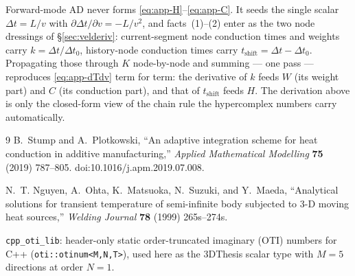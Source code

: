 \documentclass[11pt]{article}
\begin{document}
Forward-mode AD never forms \eqref{eq:app-H}--\eqref{eq:app-C}. It seeds the
single scalar $\Delta t = L/v$ with $\partial\Delta t/\partial v = -L/v^2$, and
facts~(1)--(2) enter as the two node dressings of \S\ref{sec:velderiv}:
current-segment node conduction times and weights carry $k = \Delta t/\Delta t_0$,
history-node conduction times carry $t_{\mathrm{shift}} = \Delta t - \Delta
t_0$. Propagating those through $K$ node-by-node and summing --- one pass ---
reproduces \eqref{eq:app-dTdv} term for term: the derivative of $k$ feeds $W$
(its weight part) and $C$ (its conduction part), and that of $t_{\mathrm{shift}}$
feeds $H$. The derivation above is only the closed-form view of the chain rule
the hypercomplex numbers carry automatically.

\begin{thebibliography}{9}
B.~Stump and A.~Plotkowski,
``An adaptive integration scheme for heat conduction in additive
manufacturing,''
\emph{Applied Mathematical Modelling} \textbf{75} (2019) 787--805.
doi:10.1016/j.apm.2019.07.008.

N.~T. Nguyen, A.~Ohta, K.~Matsuoka, N.~Suzuki, and Y.~Maeda,
``Analytical solutions for transient temperature of semi-infinite body
subjected to 3-D moving heat sources,''
\emph{Welding Journal} \textbf{78} (1999) 265s--274s.

\texttt{cpp\_oti\_lib}: header-only static order-truncated imaginary (OTI)
numbers for C++ (\texttt{oti::otinum<M,N,T>}), used here as the 3DThesis
scalar type with $M=5$ directions at order $N=1$.
\end{thebibliography}
\end{document}
